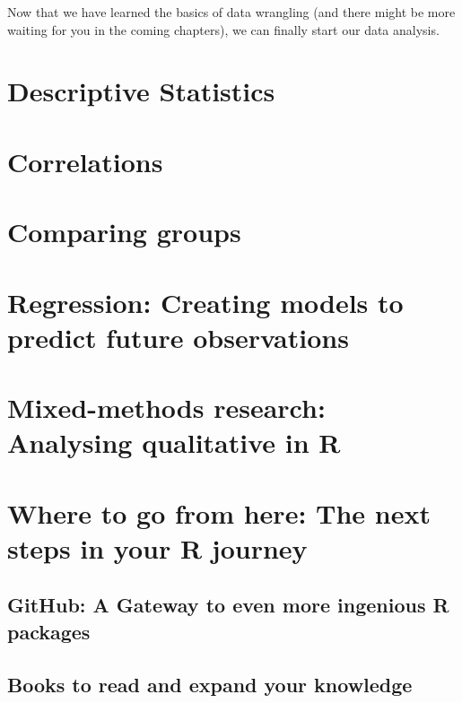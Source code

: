 \documentclass[
]{book}
\begin{document}
Now that we have learned the basics of data wrangling (and there might be more waiting for you in the coming chapters), we can finally start our data analysis.

\hypertarget{descriptive-statistics}{%
\chapter{Descriptive Statistics}\label{descriptive-statistics}}

\hypertarget{correlations}{%
\chapter{Correlations}\label{correlations}}

\hypertarget{comparing-groups}{%
\chapter{Comparing groups}\label{comparing-groups}}

\hypertarget{regression}{%
\chapter{Regression: Creating models to predict future observations}\label{regression}}

\hypertarget{mixed-methods-research-analysing-qualitative-in-r}{%
\chapter{Mixed-methods research: Analysing qualitative in R}\label{mixed-methods-research-analysing-qualitative-in-r}}

\hypertarget{next-steps}{%
\chapter{Where to go from here: The next steps in your R journey}\label{next-steps}}

\hypertarget{next-steps-github}{%
\section{GitHub: A Gateway to even more ingenious R packages}\label{next-steps-github}}

\hypertarget{next-steps-books}{%
\section{Books to read and expand your knowledge}\label{next-steps-books}}
\end{document}
